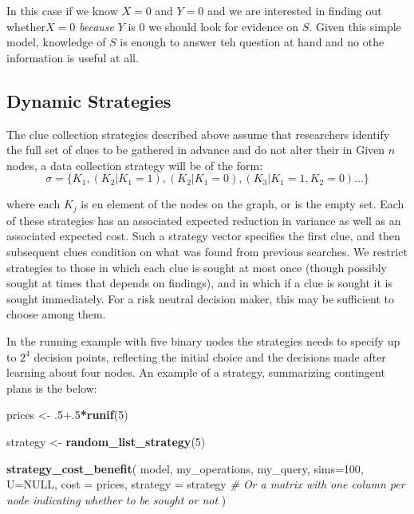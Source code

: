 \documentclass[12pt,]{book}
\newenvironment{Shaded}{\begin{snugshade}}{\end{snugshade}}
\newcommand{\CommentTok}[1]{\textcolor[rgb]{0.56,0.35,0.01}{\textit{#1}}}
\newcommand{\DataTypeTok}[1]{\textcolor[rgb]{0.13,0.29,0.53}{#1}}
\newcommand{\DecValTok}[1]{\textcolor[rgb]{0.00,0.00,0.81}{#1}}
\newcommand{\FloatTok}[1]{\textcolor[rgb]{0.00,0.00,0.81}{#1}}
\newcommand{\KeywordTok}[1]{\textcolor[rgb]{0.13,0.29,0.53}{\textbf{#1}}}
\newcommand{\NormalTok}[1]{#1}
\newcommand{\OperatorTok}[1]{\textcolor[rgb]{0.81,0.36,0.00}{\textbf{#1}}}
\newcommand{\OtherTok}[1]{\textcolor[rgb]{0.56,0.35,0.01}{#1}}
\newcommand{\StringTok}[1]{\textcolor[rgb]{0.31,0.60,0.02}{#1}}
\begin{document}
In this case if we know \(X=0\) and \(Y=0\) and we are interested in finding out whether\(X=0\) \emph{because} \(Y\) is 0 we should look for evidence on \(S\). Given this simple model, knowledge of \(S\) is enough to answer teh question at hand and no othe information is useful at all.

\hypertarget{dynamic-strategies}{%
\subsection{Dynamic Strategies}\label{dynamic-strategies}}

The clue collection strategies described above assume that researchers identify the full set of clues to be gathered in advance and do not alter their in Given \(n\) nodes, a data collection strategy will be of the form:
\[\sigma = \{K_1, (K_2|K_1 = 1), (K_2|K_1 = 0), (K_3|K_1=1, K_2 =0)\dots\}\]

where each \(K_j\) is en element of the nodes on the graph, or is the empty set. Each of these strategies has an associated expected reduction in variance as well as an associated expected cost. Such a strategy vector specifies the first clue, and then subsequent clues condition on what was found from previous searches. We restrict strategies to those in which each clue is sought at most once (though possibly sought at times that depends on findings), and in which if a clue is sought it is sought immediately. For a risk neutral decision maker, this may be sufficient to choose among them.

In the running example with five binary nodes the strategies needs to specify up to \(2^4\) decision points, reflecting the initial choice and the decisions made after learning about four nodes. An example of a strategy, summarizing contingent plans is the below:

\begin{Shaded}
\begin{Highlighting}[]
\NormalTok{prices <-}\StringTok{ }\FloatTok{.5+.5}\OperatorTok{*}\KeywordTok{runif}\NormalTok{(}\DecValTok{5}\NormalTok{)}

\NormalTok{strategy <-}\StringTok{ }\KeywordTok{random_list_strategy}\NormalTok{(}\DecValTok{5}\NormalTok{)}

\KeywordTok{strategy_cost_benefit}\NormalTok{(  model,  my_operations, my_query, }\DataTypeTok{sims=}\DecValTok{100}\NormalTok{,   }\DataTypeTok{U=}\OtherTok{NULL}\NormalTok{,   }\DataTypeTok{cost =}\NormalTok{ prices,   }\DataTypeTok{strategy =}\NormalTok{ strategy  }\CommentTok{# Or a matrix with one column per node indicating whether to be sought or not}
\NormalTok{  )}
\end{Highlighting}
\end{Shaded}
\end{document}
